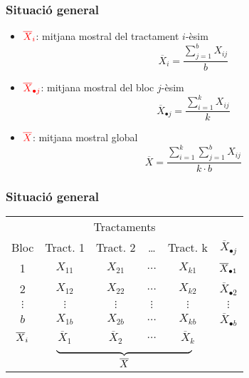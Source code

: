 \documentclass[12pt,t]{beamer}
\newcommand{\red}[1]{\textcolor{red}{#1}}
\theoremstyle{plain}
\theoremstyle{definition}
\begin{document}
\begin{frame}
\frametitle{Situació general}

\begin{itemize}

\item $\red{\overline{X}_{i}}$: mitjana mostral del tractament $i$-èsim 
$$
\overline{X}_{i}=\dfrac{\sum_{j=1}^b X_{ij}}{b}
$$

\item $\red{\overline{X}_{\bullet j}}$: mitjana mostral del bloc $j$-èsim 
$$
\overline{X}_{\bullet j}=\dfrac{\sum_{i=1}^k X_{ij}}{k}
$$

\item $\red{\overline{X}}$: mitjana mostral global 
$$
\overline{X}=\dfrac{\sum_{i=1}^k\sum_{j=1}^b X_{ij}}{k\cdot b}
$$
\end{itemize}
\end{frame}

\begin{frame}
\frametitle{Situació general}

\begin{center}
\begin{tabular}{c|cccc|c}
\multicolumn{6}{c}{Tractaments}
\\  Bloc & Tract.  1 &Tract.
 2 & \ldots &Tract.  k & $\overline{X}_{\bullet j}$ \\\hline
 1 &$X_{11}$&$X_{21}$&$\ldots$&$X_{k1}$& $\vphantom{\int^A}\overline{X}_{\bullet 1}$\\
2&$X_{12}$&$X_{22}$&$\ldots$&$X_{k2}$ & $\overline{X}_{\bullet 2}$\\
$\vdots$&$\vdots$&$\vdots$&$\vdots$&$\vdots$&$\vdots$\\
$b$&$X_{1b}$&$X_{2b}$&$\ldots$&$X_{kb}$ & $\overline{X}_{\bullet b}$\\\hline
$\vphantom{\int^A}\overline{X}_i$ & $\overline{X}_1$ & $\overline{X}_2$ &  $\ldots$ & $\overline{X}_k$\\[-2ex]
\multicolumn{6}{c}{$\underbrace{\hphantom{\overline{X}_{11}+\overline{X}_{11}+\overline{X}_{11}+\overline{X}_{11}+\overline{X}_{11}}}_{\displaystyle \overline{X}}$}
\end{tabular}
\end{center}

\end{frame}
\end{document}
